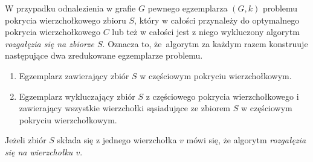 {\begin{bproof}
  \end{bproof}
  \begin{definition}
    W przypadku odnalezienia w grafie $G$ pewnego egzemplarza $(G, k)$ problemu pokrycia wierzchołkowego zbioru $S$, który w całości przynależy do optymalnego pokrycia wierzchołkowego $C$ lub też w całości jest z niego wykluczony algorytm \emph{rozgałęzia się na zbiorze $S$}.
    Oznacza to, że algorytm za każdym razem konstruuje następujące dwa zredukowane egzemplarze problemu.
    \begin{enumerate}
      \item Egzemplarz zawierający zbiór $S$ w częściowym pokryciu wierzchołkowym.
      \item Egzemplarz wykluczający zbiór $S$ z częściowego pokrycia wierzchołkowego i zawierający wszystkie wierzchołki sąsiadujące ze zbiorem $S$ w częściowym pokryciu wierzchołkowym.
    \end{enumerate}
    Jeżeli zbiór $S$ składa się z jednego wierzchołka $v$ mówi się, że algorytm \emph{rozgałęzia się na wierzchołku $v$}.
  \end{definition}
}

